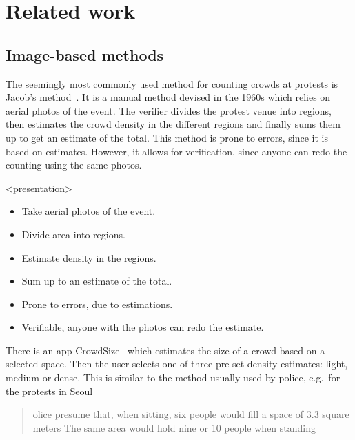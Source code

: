 \mode*
\section{Related work}

\subsection<presentation>{Image-based methods}

The seemingly most commonly used method for counting crowds at protests is 
Jacob's method~\cite[c.f.][]{%
  2016DemonstrationsInSeoul,%
  BBCHowToCountProtestNumbers,%
  HowWillWeKnowTrumpInauguralCrowdSize,%
  TheXManMarch,%
  TheCrowdNumbersGame,%
}.
It is a manual method devised in the 1960s which relies on aerial photos of the 
event.
The verifier divides the protest venue into regions, then estimates the crowd 
density in the different regions and finally sums them up to get an estimate of 
the total.
This method is prone to errors, since it is based on estimates.
However, it allows for verification, since anyone can redo the counting using 
the same photos.

\begin{frame}<presentation>
  \begin{solution}
    \begin{itemize}
      \item Take aerial photos of the event.
      \item Divide area into regions.
      \item Estimate density in the regions.
      \item Sum up to an estimate of the total.
    \end{itemize}
  \end{solution}

  \pause

  \begin{remark}
    \begin{itemize}
      \item Prone to errors, due to estimations.
      \item Verifiable, anyone with the photos can redo the estimate.
    \end{itemize}
  \end{remark}
\end{frame}

There is an app CrowdSize~\cite{CrowdSize} which estimates the size of a crowd 
based on a selected space.
Then the user selects one of three pre-set density estimates: light, medium or 
dense.
This is similar to the method usually used by police, e.g.\ for the protests in
Seoul
\blockcquote{2016DemonstrationsInSeoul}{%
  olice presume that, when sitting, six people would 
  fill a space of 
  3.3 square meters
  \textelp{}
  The same area would hold nine or 10 people when standing%
}.

